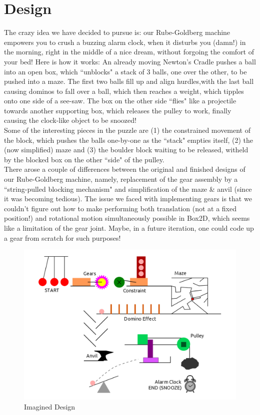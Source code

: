 \documentclass [a4paper, 11pt] {article}
\begin{document}
\section {Design}
The crazy idea we have decided to pursue is: our Rube-Goldberg machine empowers you to crush a buzzing alarm clock, when it disturbs you (damn!) in the morning, right
in the middle of a nice dream, without forgoing the comfort of your bed! Here is how it works: An already moving Newton's Cradle pushes a ball into an open box, which
``unblocks" a stack of 3 balls, one over the other, to be pushed into a maze. The first two balls fill up and align hurdles,with the last ball causing dominos to fall over a ball,
which then reaches a weight, which tipples onto one side of a see-saw. The box on the other side ``flies" like a projectile towards another supporting box, which releases
the pulley to work, finally causing the clock-like object to be snoozed!\\

\noindent{}Some of the interesting pieces in the puzzle are (1) the constrained movement of the block, which pushes the
balls one-by-one as the ``stack" empties itself, (2) the (now simplified) maze and (3) the boulder block waiting to be released, witheld by the blocked box on the other
``side" of the pulley.\\

\noindent{}There arose a couple of differences between the original and finished designs of our Rube-Goldberg machine, namely, replacement of the gear assembly by
a ``string-pulled blocking mechanism" and simplification of the maze \& anvil (since it was becoming tedious). The issue we faced with implementing gears is that we
couldn't figure out how to make performing both translation (not at a fixed position!) and rotational motion simultaneously possible in Box2D, which seems like a limitation
of the gear joint. Maybe, in a future iteration, one could code up a gear from scratch for such purposes!

\begin{figure}[htpb]
	\includegraphics[width=\linewidth]{doc/images/prev}
	\caption{Imagined Design}
\end{figure}
\end{document}
